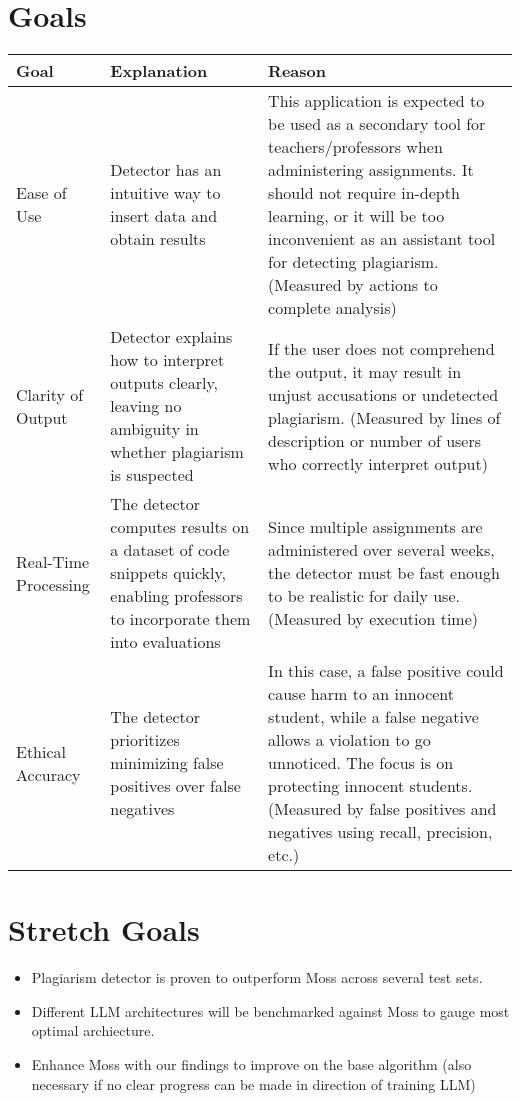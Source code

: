 \documentclass{article}
\begin{document}

\section{Goals}

\begin{center}
\hspace*{-1cm}
\begin{tabular}{ | p{3cm} | p{6cm} | p{6cm} | }
\hline
Goal & Explanation & Reason \\
\hline
Ease of Use & Detector has an intuitive way to insert data and obtain results &
This application is expected to be used as a secondary tool for
teachers/professors when administering assignments. It should not require
in-depth learning, or it will be too inconvenient as an assistant tool for
detecting plagiarism. (Measured by actions to complete analysis)\\
\hline
Clarity of Output & Detector explains how to interpret outputs clearly, leaving
no ambiguity in whether plagiarism is suspected & If the user does not
comprehend the output, it may result in unjust accusations or undetected
plagiarism. (Measured by lines of description or number of users who correctly
interpret output)\\
\hline
Real-Time Processing & The detector computes results on a dataset of code
snippets quickly, enabling professors to incorporate them into evaluations &
Since multiple assignments are administered over several weeks, the detector
must be fast enough to be realistic for daily use. (Measured by execution
time)\\
\hline
Ethical Accuracy & The detector prioritizes minimizing false positives over
false negatives & In this case, a false positive could cause harm to an innocent
student, while a false negative allows a violation to go unnoticed. The focus is
on protecting innocent students. (Measured by false positives and negatives
using recall, precision, etc.)\\
\hline
\end{tabular}
\end{center}


 
\section{Stretch Goals}
\begin{itemize}
  \item Plagiarism detector is proven to outperform Moss across several test
  sets.
  \item Different LLM architectures will be benchmarked against Moss to gauge
  most optimal archiecture.
  \item Enhance Moss with our findings to improve on the base algorithm (also
  necessary if no clear progress can be made in direction of training LLM)
  
\end{itemize}
\end{document}
